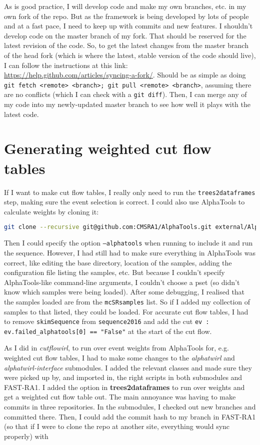 As is good practice, I will develop code and make my own branches, etc. in my own fork of the repo. But as the framework is being developed by lots of people and at a fast pace, I need to keep up with commits and new features. I shouldn't develop code on the master branch of my fork. That should be reserved for the latest revision of the code. So, to get the latest changes from the master branch of the head fork (which is where the latest, stable version of the code should live), I can follow the instructions at this link: \url{https://help.github.com/articles/syncing-a-fork/}. Should be as simple as doing \texttt{git fetch <remote> <branch>; git pull <remote> <branch>}, assuming there are no conflicts (which I can check with a \texttt{git diff}). Then, I can merge any of my code into my newly-updated master branch to see how well it plays with the latest code.


\section{Generating weighted cut flow tables}

If I want to make cut flow tables, I really only need to run the \texttt{trees2dataframes} step, making sure the event selection is correct. I could also use AlphaTools to calculate weights by cloning it:

\begin{lstlisting}[belowskip=-0.7cm, language=sh, numbers=none]
git clone --recursive git@github.com:CMSRA1/AlphaTools.git external/AlphaTools
\end{lstlisting}

Then I could specify the option \texttt{--alphatools} when running to include it and run the sequence. However, I had still had to make sure everything in AlphaTools was correct, like editing the base directory, location of the samples, adding the configuration file listing the samples, etc. But because I couldn't specify AlphaTools-like command-line arguments, I couldn't choose a pset (so didn't know which samples were being loaded). After some debugging, I realised that the samples loaded are from the \texttt{mcSRsamples} list. So if I added my collection of samples to that listed, they could be loaded. For accurate cut flow tables, I had to remove \texttt{skimSequence} from \texttt{sequence2016} and add the cut \texttt{ev : ev.failed\_alphatools[0] == "False"} at the start of the cut flow.

As I did in \emph{cutflowirl}, to run over event weights from AlphaTools for, e.g. weighted cut flow tables, I had to make some changes to the \emph{alphatwirl} and \emph{alphatwirl-interface} submodules. I added the relevant classes and made sure they were picked up by, and imported in, the right scripts in both submodules and FAST-RA1. I added the option in \textbf{trees2dataframes} to run over weights and get a weighted cut flow table out. The main annoyance was having to make commits in three repositories. In the submodules, I checked out new branches and committed there. Then, I could add the commit hash to my branch in FAST-RA1 (so that if I were to clone the repo at another site, everything would sync properly) with

